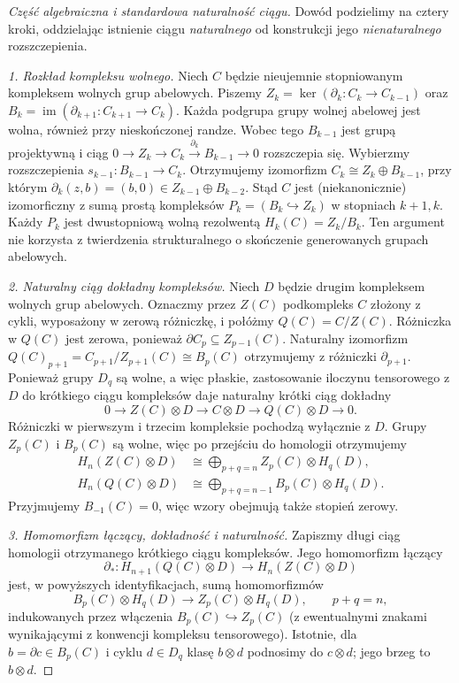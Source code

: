 \begin{proof}[Część algebraiczna i standardowa naturalność ciągu]
Dowód podzielimy na cztery kroki, oddzielając istnienie ciągu
\emph{naturalnego} od konstrukcji jego \emph{nienaturalnego} rozszczepienia.

\emph{1. Rozkład kompleksu wolnego.}
Niech $C$ będzie nieujemnie stopniowanym kompleksem wolnych grup
abelowych. Piszemy $Z_k=\ker(\partial_k:C_k\to C_{k-1})$ oraz
$B_k=\operatorname{im}(\partial_{k+1}:C_{k+1}\to C_k)$.
Każda podgrupa grupy wolnej abelowej jest wolna, również
przy nieskończonej randze. Wobec tego $B_{k-1}$ jest grupą
projektywną i ciąg
$0\to Z_k\to C_k\xrightarrow{\partial_k}B_{k-1}\to0$
rozszczepia się. Wybierzmy rozszczepienia
$s_{k-1}:B_{k-1}\to C_k$. Otrzymujemy izomorfizm
$C_k\cong Z_k\oplus B_{k-1}$, przy którym
$\partial_k(z,b)=(b,0)\in Z_{k-1}\oplus B_{k-2}$.
Stąd $C$ jest (niekanonicznie) izomorficzny z sumą prostą
kompleksów $P_k=(B_k\hookrightarrow Z_k)$ w stopniach
$k+1,k$. Każdy $P_k$ jest dwustopniową wolną rezolwentą
$H_k(C)=Z_k/B_k$. Ten argument nie korzysta z twierdzenia
strukturalnego o skończenie generowanych grupach abelowych.

\emph{2. Naturalny ciąg dokładny kompleksów.}
Niech $D$ będzie drugim kompleksem wolnych grup abelowych.
Oznaczmy przez $Z(C)$ podkompleks $C$ złożony z cykli,
wyposażony w zerową różniczkę, i połóżmy $Q(C)=C/Z(C)$.
Różniczka w $Q(C)$ jest zerowa, ponieważ
$\partial C_p\subseteq Z_{p-1}(C)$.
Naturalny izomorfizm
$Q(C)_{p+1}=C_{p+1}/Z_{p+1}(C)\cong B_p(C)$
otrzymujemy z różniczki $\partial_{p+1}$.
Ponieważ grupy $D_q$ są wolne, a więc płaskie,
zastosowanie iloczynu tensorowego z $D$ do krótkiego
ciągu kompleksów daje naturalny krótki ciąg dokładny
\[
 0\longrightarrow Z(C)\otimes D
 \longrightarrow C\otimes D
 \longrightarrow Q(C)\otimes D\longrightarrow0.
\]
Różniczki w pierwszym i trzecim kompleksie pochodzą
wyłącznie z $D$. Grupy $Z_p(C)$ i $B_p(C)$ są wolne,
więc po przejściu do homologii otrzymujemy
\[
\begin{aligned}
 H_n(Z(C)\otimes D)
 &\cong\bigoplus_{p+q=n}Z_p(C)\otimes H_q(D),\\
 H_n(Q(C)\otimes D)
 &\cong\bigoplus_{p+q=n-1}B_p(C)\otimes H_q(D).
\end{aligned}
\]
Przyjmujemy $B_{-1}(C)=0$, więc wzory obejmują także
stopień zerowy.

\emph{3. Homomorfizm łączący, dokładność i naturalność.}
Zapiszmy długi ciąg homologii otrzymanego krótkiego ciągu
kompleksów. Jego homomorfizm łączący
\[
 \partial_*:H_{n+1}(Q(C)\otimes D)
 \longrightarrow H_n(Z(C)\otimes D)
\]
jest, w powyższych identyfikacjach, sumą homomorfizmów
\[
 B_p(C)\otimes H_q(D)\longrightarrow
 Z_p(C)\otimes H_q(D),\qquad p+q=n,
\]
indukowanych przez włączenia $B_p(C)\hookrightarrow Z_p(C)$
(z ewentualnymi znakami wynikającymi z konwencji kompleksu
tensorowego). Istotnie, dla $b=\partial c\in B_p(C)$ i cyklu
$d\in D_q$ klasę $b\otimes d$ podnosimy do $c\otimes d$;
jego brzeg to $b\otimes d$.


\end{proof}

